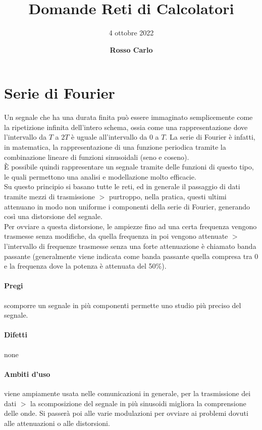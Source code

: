 \documentclass{article}
\title{\vspace{2cm}\textbf{Domande Reti di Calcolatori}}
\author{\vspace{3mm}4 ottobre 2022}
\date{\vspace{3mm} \textbf{Rosso Carlo}}
\begin{document}
\tableofcontents
\newpage

\section{Serie di Fourier}
Un segnale che ha una durata finita può essere immaginato semplicemente come la
ripetizione infinita dell'intero schema, ossia come una rappresentazione dove
l'intervallo da $T$ a $2T$ è uguale all'intervallo da $0$ a $T$. La serie di
Fourier è infatti, in matematica, la rappresentazione di una funzione periodica
tramite la combinazione lineare di funzioni sinusoidali (seno e coseno). \\ 
È possibile quindi rappresentare un segnale tramite delle funzioni di questo
tipo, le quali permettono una analisi e modellazione molto efficacie. \\
Su questo principio si basano tutte le reti, ed in generale il passaggio di dati
tramite mezzi di trasmissione $>$ purtroppo, nella pratica, questi ultimi
attenuano in modo non uniforme i componenti della serie di Fourier, generando
così una distorsione del segnale. \\
Per ovviare a questa distorsione, le ampiezze fino ad una certa frequenza
vengono trasmesse senza modifiche, da quella frequenza in poi vengono attenuate
$>$ l'intervallo di frequenze trasmesse senza una forte attenuazione è chiamato
banda passante (generalmente viene indicata come banda passante quella compresa
tra 0 e la frequenza dove la potenza è attenuata del 50\%).

\paragraph{Pregi} scomporre un segnale in più componenti permette uno studio più
preciso del segnale.

\paragraph{Difetti} none

\paragraph{Ambiti d'uso} viene ampiamente usata nelle comunicazioni in generale,
per la trasmissione dei dati $>$ la scomposizione del segnale in più sinusoidi
migliora la comprensione delle onde. Si passerà poi alle varie modulazioni per
ovviare ai problemi dovuti alle attenuazioni o alle distorsioni.
\end{document}
